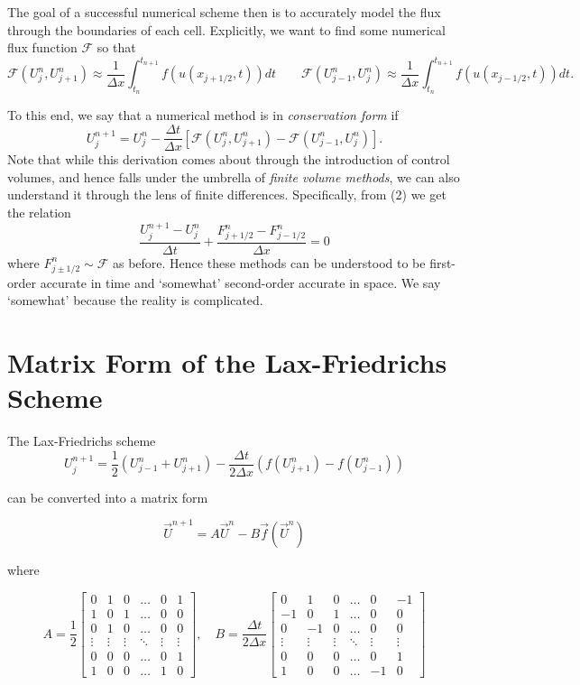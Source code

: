 \documentclass{myproject}
\begin{document}
The goal of a successful numerical scheme then is to accurately model the flux through the boundaries of each cell. Explicitly, we want to find some numerical flux function $\mathcal{F}$ so that 
\[
    \mathcal{F}(U_j^n, U_{j+1}^n) \approx \frac{1}{\Delta x} \int_{t_n}^{t_{n+1}} f(u(x_{j+1/2}, t)) dt \qquad \mathcal{F}(U_{j-1}^n, U_{j}^n) \approx \frac{1}{\Delta x} \int_{t_n}^{t_{n+1}} f(u(x_{j-1/2}, t)) dt.
\]

To this end, we say that a numerical method is in \emph{conservation form} if 
\[
    U_j^{n+1} = U_j^n - \frac{\Delta t}{\Delta x} \left[ \mathcal{F}(U_{j}^{n}, U_{j+1}^{n}) - \mathcal{F}(U_{j-1}^{n}, U_{j}^{n}) \right].
\]
Note that while this derivation comes about through the introduction of control volumes, and hence falls under the umbrella of \emph{finite volume methods}, we can also understand it through the lens of finite differences. Specifically, from (2) we get the relation
\[
    \frac{U_j^{n+1} - U_j^n}{\Delta t} + \frac{F_{j+1/2}^n - F_{j-1/2}^n}{\Delta x} = 0
\]
where $F_{j\pm1/2}^n \sim \mathcal{F}$ as before. Hence these methods can be understood to be first-order accurate in time and `somewhat' second-order accurate in space. We say `somewhat' because the reality is complicated.

\section{Matrix Form of the Lax-Friedrichs Scheme}
The Lax-Friedrichs scheme
\[
    U_j^{n+1} = \frac{1}{2}\left( U_{j-1}^{n} + U_{j+1}^{n} \right) - \frac{\Delta t}{2\Delta x}\left( f(U_{j+1}^{n}) - f(U_{j-1}^{n}) \right)
\]

can be converted into a matrix form

\[
\vec{U}^{n+1} = A\vec{U}^{n} - B\vec{f}(\vec{U}^{n})
\]

where

\[
A = \frac{1}{2}
\begin{bmatrix}
0 & 1 & 0 & \dots & 0 & 1 \\
1 & 0 & 1 & \dots & 0 & 0 \\
0 & 1 & 0 & \dots & 0 & 0 \\
\vdots & \vdots & \vdots & \ddots & \vdots & \vdots \\
0 & 0 & 0 & \dots & 0 & 1 \\
1 & 0 & 0 & \dots & 1 & 0
\end{bmatrix},
\quad
B = \frac{\Delta t}{2 \Delta x}
\begin{bmatrix}
0 & 1 & 0 & \dots & 0 & -1 \\
-1 & 0 & 1 & \dots & 0 & 0 \\
0 & -1 & 0 & \dots & 0 & 0 \\
\vdots & \vdots & \vdots & \ddots & \vdots & \vdots \\
0 & 0 & 0 & \dots & 0 & 1 \\
1 & 0 & 0 & \dots & -1 & 0
\end{bmatrix}
\]
\end{document}
